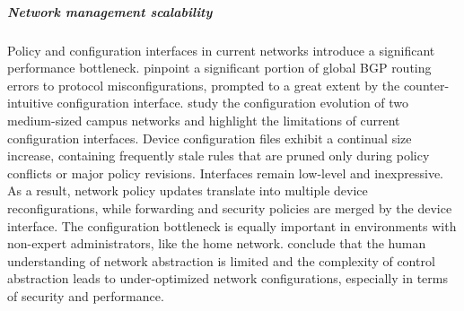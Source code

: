
\subparagraph{Network management scalability}

Policy and configuration interfaces in current networks introduce a significant
performance bottleneck.   pinpoint a significant portion of
global BGP routing errors to protocol misconfigurations, prompted to a great
extent by the counter-intuitive configuration interface.   study
the configuration evolution of two medium-sized campus networks and highlight
the limitations of current configuration interfaces.  Device configuration
files exhibit a continual size increase, containing frequently stale rules that
are pruned only during policy conflicts or major policy revisions.  Interfaces
remain low-level and inexpressive. As a result, network policy updates
translate into multiple device reconfigurations, while forwarding and security
policies are merged by the device interface. The configuration bottleneck is
equally important in environments with non-expert administrators, like the home
network.  conclude that the human understanding of network
abstraction is limited and the complexity of control abstraction leads to
under-optimized network configurations, especially  in terms of security and
performance. 

